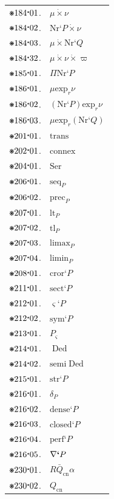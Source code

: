 \documentclass[12pt,openany,leqno,twocolumn]{book}
\newcommand{\pmast}{\text{\resizebox{!}{.75\height}{\ding{107}}}} %
\newcommand{\pmcdot}{\text{\raisebox{.05cm}{$\boldsymbol\cdot$}}} %
\newcommand{\pmcirc}[1]{\mathbf{\dot{\text{$#1$}}}}
\newcommand{\pmArexp}{\text{exp}}
\newcommand{\pmnr}[1]{\text{Nr}\textbf{`}#1} %
\newcommand{\pmNr}{\text{Nr}}
\newcommand{\pmrnprod}[2]{#1 \mathrel{\pmcirc{\times}} #2} %
\newcommand{\pmrnprodf}[1]{\Pi\pmNr\textbf{`}#1} %
\newcommand{\pmrnexp}[3]{#2 \mathrel{\pmArexp_{#1}} #3} %
\newcommand{\pmtrans}{\text{trans}} %
\newcommand{\pmconnex}{\text{connex}} %
\newcommand{\pmser}{\text{Ser}} %
\newcommand{\pmSeq}[1]{\text{seq}_{#1}}
\newcommand{\pmPrec}[1]{\text{prec}_{#1}}
\newcommand{\pmlt}[1]{\text{lt}_{#1}} %
\newcommand{\pmtl}[1]{\text{tl}_{#1}} %
\newcommand{\pmLimax}[1]{\text{limax}_{#1}}
\newcommand{\pmLimin}[1]{\text{limin}_{#1}}
\newcommand{\pmcror}[1]{\text{cror}\textbf{`}{#1}} %
\newcommand{\pmsect}[1]{\text{sect}\textbf{`}{#1}} %
\newcommand{\pmseg}[1]{\boldsymbol{\varsigma}\textbf{`}{#1}} %
\newcommand{\pmSeg}{\boldsymbol{\varsigma}}
\newcommand{\pmsym}[1]{\text{sym}\textbf{`}{#1}} %
\newcommand{\pmsectr}[1]{{#1}_{\pmSeg}} %
\newcommand{\pmded}{\mathrel{\text{Ded}}}  %
\newcommand{\pmsded}{\mathrel{\text{semi}\;\text{Ded}}} %
\newcommand{\pmstr}[1]{\text{str}\textbf{`}{#1}} %
\newcommand{\pmDer}[1]{\delta_{#1}}
\newcommand{\pmden}[1]{\text{dense}\textbf{`}{#1}} %
\newcommand{\pmclsd}[1]{\text{closed}\textbf{`}{#1}} %
\newcommand{\pmperf}[1]{\text{perf}\textbf{`}{#1}} %
\newcommand{\pmders}[1]{\rotatebox[origin=c]{180}{$\Delta$}\textbf{`}#1} %
\newcommand{\pmconv}[3]{#1\bar{#2}_{\text{cn}}#3} %
\newcommand{\pmConv}[1]{{#1}_{\text{cn}}} %
\begin{document}
\begin{tabular}{l l}
	$\pmast184\pmcdot01$. & $\pmrnprod{\mu}{\nu}$ \\
	$\pmast184\pmcdot02$. & $\pmrnprod{\pmnr{P}}{\nu}$ \\
	$\pmast184\pmcdot03$. & $\pmrnprod{\mu}{\pmnr{Q}}$ \\
	$\pmast184\pmcdot32$. & $\pmrnprod{\mu}{\pmrnprod{\nu}{\varpi}}$ \\
	$\pmast185\pmcdot01$. & $\pmrnprodf{P}$ \\
	$\pmast186\pmcdot01$. & $\pmrnexp{r}{\mu}{\nu}$ \\
	$\pmast186\pmcdot02$. & $\pmrnexp{r}{(\pmnr{P})}{\nu}$ \\
	$\pmast186\pmcdot03$. & $\pmrnexp{r}{\mu}{(\pmnr{Q})}$ \\
	$\pmast201\pmcdot01$. & $\pmtrans$ \\
	$\pmast202\pmcdot01$. & $\pmconnex$ \\
	$\pmast204\pmcdot01$. & $\pmser$ \\
	$\pmast206\pmcdot01$. & $\pmSeq{P}$ \\
	$\pmast206\pmcdot02$. & $\pmPrec{P}$ \\
	$\pmast207\pmcdot01$. & $\pmlt{P}$ \\
	$\pmast207\pmcdot02$. & $\pmtl{P}$ \\
	$\pmast207\pmcdot03$. & $\pmLimax{P}$ \\
	$\pmast207\pmcdot04$. & $\pmLimin{P}$ \\
	$\pmast208\pmcdot01$. & $\pmcror{P}$ \\
	$\pmast211\pmcdot01$. & $\pmsect{P}$ \\
	$\pmast212\pmcdot01$. & $\pmseg{P}$ \\
	$\pmast212\pmcdot02$. & $\pmsym{P}$ \\
	$\pmast213\pmcdot01$. & $\pmsectr{P}$ \\
	$\pmast214\pmcdot01$. & $\pmded$ \\
	$\pmast214\pmcdot02$. & $\pmsded$ \\
	$\pmast215\pmcdot01$. & $\pmstr{P}$ \\
	$\pmast216\pmcdot01$. & $\pmDer{P}$ \\
	$\pmast216\pmcdot02$. & $\pmden{P}$ \\
	$\pmast216\pmcdot03$. & $\pmclsd{P}$ \\
	$\pmast216\pmcdot04$. & $\pmperf{P}$ \\
	$\pmast216\pmcdot05$. & $\pmders{P}$ \\
	$\pmast230\pmcdot01$. & $\pmconv{R}{Q}{\alpha}$ \\
	$\pmast230\pmcdot02$. & $\pmConv{Q}$ 
\end{tabular}
\end{document}
